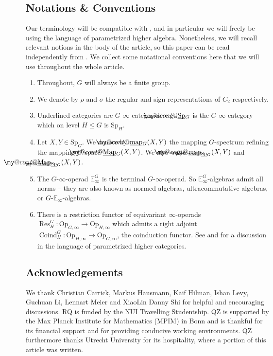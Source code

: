 \documentclass[a4paper, 10pt]{article}
\makeatletter
\newcommand{\E}{\mathbb E}  %
\newcommand{\Sp}{\mathrm{Sp}}
\newcommand{\Op}{\mathrm{Op}}
\newcommand{\Map}{\operatorname{Map}}
\newcommand{\Res}{\operatorname{Res}}
\newcommand{\map}{\operatorname{map}}
\newcommand{\Coind}{\operatorname{Coind}}
\DeclareRobustCommand{\myuline}[2][0pt]{%
  \ifmmode
    \uline{\hphantom{#2}\kern-#1}%
    \kern#1%
    \mathllap{\mathpalette\my@cont@{#2}}%
  \else
    \uline{\phantom{#2}\kern-#1}%
    \kern#1%
    \llap{\contour{white}{#2}}%
  \fi
}
\newcommand{\ul}{\myuline}
\newcommand{\my@cont@}[2]{\contour{white}{\mbox{$\m@th#1#2$}}}
\theoremstyle{definition}
\makeatother
\begin{document}
\subsection*{Notations \& Conventions}
Our terminology will be compatible with \cite{quinnZhu2026multiplicativeequivariantthomspectra}, and in particular we will freely be using the language of parametrized higher algebra. Nonetheless, we will recall relevant notions in the body of the article, so this paper can be read independently from \cite{quinnZhu2026multiplicativeequivariantthomspectra}. We collect some notational conventions here that we will use throughout the whole article.
\begin{enumerate}[(1)]
    \item Throughout, $G$ will always be a finite group.
    \item We denote by $\rho$  and \(\sigma\) the regular and sign representations of $C_2$ respectively.
    \item Underlined categories are $G$-$\infty$-categories, e.g. $\ul{\Sp}_G$ is the $G$-$\infty$-category which on level $H \leq G$ is $\Sp_H$.
    \item Let $X,Y \in \Sp_G$. We  denote by $\ul{\map}_G(X, Y)$ the mapping $G$-spectrum refining the mapping $G$-space $\ul{\Map}_G(X, Y)$. We also write $\ul{\map}_{\ul{\Sp}_G}(X, Y)$ and $\ul{\Map}_{\ul{\Sp}_G}(X, Y)$.
    \item The $G$-$\infty$-operad $\E_{\infty}^G$ is the terminal $G$-$\infty$-operad. So $\E_{\infty}^G$-algebras admit all norms -- they are also known as normed algebras, ultracommutative algebras, or \(G\)-\(\E_\infty\)-algebras.
    \item There is a restriction functor of equivariant $\infty$-operads $\Res_H^G \colon \Op_{G, \infty} \to \Op_{H, \infty}$ which admits a right adjoint $\Coind_H^G \colon \Op_{H, \infty} \to \Op_{G, \infty}$, the coinduction functor. See \cite[Section 1.3.1]{stewart2025tensorproductsequivariantcommutative} and \cite[Remark 2.2.5]{quinnZhu2026multiplicativeequivariantthomspectra} for a discussion in the language of parametrized higher categories.
\end{enumerate}

\subsection*{Acknowledgements}
We thank Christian Carrick, Markus Hausmann, Kaif Hilman, Ishan Levy, Guchuan Li, Lennart Meier and XiaoLin Danny Shi for helpful and encouraging discussions.
RQ is funded by the NUI Travelling Studentship. QZ is supported by the Max Planck Institute for Mathematics (MPIM) in Bonn and is thankful
for its financial support and for providing  conducive working environments. QZ furthermore thanks Utrecht University for its hospitality, where a portion of this article was written.
\end{document}
